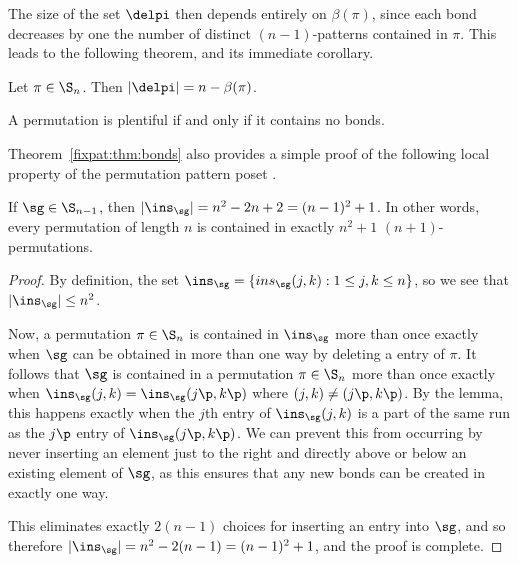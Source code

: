 \documentclass[12pt,twoside]{memoir}
\begin{document}
      The size of the set $\delpi$ then depends entirely on $\beta(\pi)$, since
      each bond decreases by one the number of distinct $(n-1)$-patterns
      contained in $\pi$. This leads to the following theorem, and its immediate
      corollary. 

      \begin{theorem} \label{fixpat:thm:bonds}
        Let $\pi \in \S_n$. Then $|\delpi| = n - \beta(\pi)$. 
      \end{theorem}

      \begin{corollary} \label{fixpat:cor:alldistinct}
        A permutation is plentiful if and only if it contains no bonds. 
      \end{corollary}

      Theorem~\ref{fixpat:thm:bonds} also provides a simple proof of the
      following local property of the permutation pattern poset . 

      \begin{corollary} \label{fixpat:cor:n2+1} 
        If $\sg \in \S_{n-1}$, then $|\ins_\sg| = n^2 - 2n + 2 = (n-1)^2 + 1$. In
        other words, every permutation of length $n$ is contained in exactly $n^2 +1$
        $(n+1)$-permutations. 
      \end{corollary}
      \begin{proof}

        By definition, the set $\ins_\sg = \{ins_\sg(j,k) : 1 \leq j , k \leq
        n\}$, so we see that $|\ins_\sg| \leq n^2$.

        Now, a permutation $\pi \in \S_n$ is contained in $\ins_\sg$ more than once
        exactly when $\sg$ can be obtained in more than one way by deleting a entry
        of $\pi$. It follows that $\sg$ is contained in a permutation $\pi \in \S_n$
        more than once exactly when $\ins_\sg(j,k) = \ins_\sg(j\p,k\p)$ where
        $(j,k) \neq (j\p,k\p)$. By the lemma, this happens exactly when the $j$th
        entry of
        $\ins_\sg(j,k)$ is a part of the same run as the $j\p$ entry of
        $\ins_\sg(j\p,k\p)$. We can prevent this from occurring by never inserting
        an element just to the right and directly above or below an existing
        element of $\sg$, as this ensures that any new bonds can be created in
        exactly one way. 

        This eliminates exactly $2(n-1)$ choices for inserting an entry into $\sg$,
        and so therefore $|\ins_\sg| = n^2 - 2(n-1) = (n-1)^2 +1$, and the proof
        is complete.  
      \end{proof}
\end{document}
